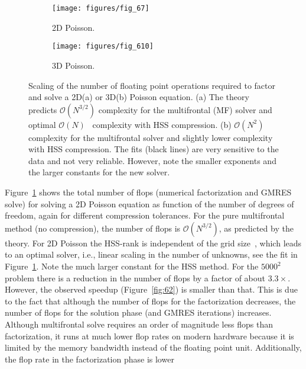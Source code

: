 \documentclass{article}
\begin{document}
\begin{figure}
  \begin{center}
    \begin{subfigure}{.49\textwidth}
      \texttt{[image: figures/fig\_67]}
      \caption{\footnotesize 2D Poisson.}
      \label{fig:67}
    \end{subfigure}
    \begin{subfigure}{.49\textwidth}
      \texttt{[image: figures/fig\_610]}
      \caption{\footnotesize 3D Poisson.}
      \label{fig:610}
    \end{subfigure}
  \end{center}
  \caption{\footnotesize Scaling of the number of floating point operations
    required to factor and solve a 2D(a) or 3D(b) Poisson
    equation. (a) The theory predicts $\mathcal{O}(N^{3/2})$
    complexity for the multifrontal (MF) solver and optimal
    $\mathcal{O}(N)$~\cite{xia2013randomized} complexity with HSS
    compression. (b) $\mathcal{O}(N^{2})$ complexity for the
    multifrontal solver and slightly lower complexity with HSS
    compression. The fits (black lines) are very sensitive to the data
    and not very reliable. However, note the smaller exponents and the
    larger constants for the new solver.}
  \label{fig:Poisson2D3D_scaling}
\end{figure}
Figure~\ref{fig:67} shows the total number of flops (numerical
factorization and GMRES solve) for solving a 2D Poisson equation as
function of the number of degrees of freedom, again for different
compression tolerances. For the pure multifrontal method (no
compression), the number of flops is $\mathcal{O}(N^{3/2})$, as
predicted by the theory. For 2D Poisson the HSS-rank is independent of
the grid size~\cite{chandrasekaran2010numerical}, which leads to an
optimal solver, i.e., linear scaling in the number of unknowns, see
the fit in Figure~\ref{fig:67}.
Note the much larger constant for the HSS method. For the $5000^2$
problem there is a reduction in the number of flops by a factor of
about $3.3\times$. However, the observed speedup (Figure~\ref{fig:62}) is
smaller than that. This is due to the fact that although the number of
flops for the factorization decreases, the number of flops for the
solution phase (and GMRES iterations) increases. Although multifrontal
solve requires an order of magnitude less flops than factorization, it
runs at much lower flop rates on modern hardware because it is limited
by the memory bandwidth instead of the floating point
unit. Additionally, the flop rate in the factorization phase is lower
\end{document}
